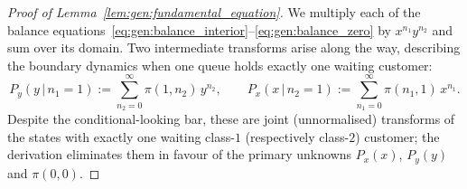 \begin{proof}[Proof of Lemma~\ref{lem:gen:fundamental_equation}]

    We multiply each of the balance equations~\eqref{eq:gen:balance_interior}--\eqref{eq:gen:balance_zero} by $x^{n_1}y^{n_2}$ and sum over its domain. Two intermediate transforms arise along the way, describing the boundary dynamics when one queue holds exactly one waiting customer:
    \begin{equation*}
        P_y(y \,|\, n_1{=}1) := \sum_{n_2=0}^{\infty} \pi(1,n_2)\, y^{n_2},
        \qquad
        P_x(x \,|\, n_2{=}1) := \sum_{n_1=0}^{\infty} \pi(n_1,1)\, x^{n_1}.
    \end{equation*}
    Despite the conditional-looking bar, these are joint (unnormalised) transforms of the states with exactly one waiting class-$1$ (respectively class-$2$) customer; the derivation eliminates them in favour of the primary unknowns $P_x(x)$, $P_y(y)$ and $\pi(0,0)$.


\end{proof}
